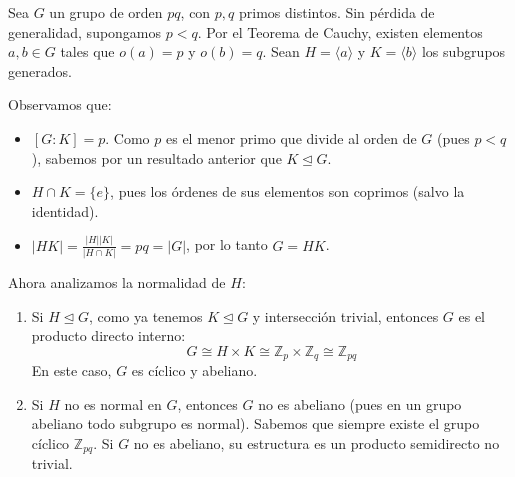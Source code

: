 \begin{eje}
    Sea $G$ un grupo de orden $pq$, con $p, q$ primos distintos. Sin pérdida de generalidad, supongamos $p < q$.
    Por el Teorema de Cauchy, existen elementos $a, b \in G$ tales que $o(a) = p$ y $o(b) = q$.
    Sean $H = \langle a \rangle$ y $K = \langle b \rangle$ los subgrupos generados.
    
    Observamos que:
    \begin{itemize}
        \item $[G : K] = p$. Como $p$ es el menor primo que divide al orden de $G$ (pues $p < q$), sabemos por un resultado anterior que $K \trianglelefteq G$.
        \item $H \cap K = \{e\}$, pues los órdenes de sus elementos son coprimos (salvo la identidad).
        \item $|HK| = \frac{|H||K|}{|H \cap K|} = pq = |G|$, por lo tanto $G = HK$.
    \end{itemize}

    Ahora analizamos la normalidad de $H$:
    \begin{enumerate}
        \item[i)] Si $H \trianglelefteq G$, como ya tenemos $K \trianglelefteq G$ y intersección trivial, entonces $G$ es el producto directo interno:
        \begin{equation*}
            G \cong H \times K \cong \mathbb{Z}_p \times \mathbb{Z}_q \cong \mathbb{Z}_{pq}
        \end{equation*}
        En este caso, $G$ es cíclico y abeliano.
        
        \item[ii)] Si $H$ no es normal en $G$, entonces $G$ no es abeliano (pues en un grupo abeliano todo subgrupo es normal).
        Sabemos que siempre existe el grupo cíclico $\mathbb{Z}_{pq}$.
        Si $G$ no es abeliano, su estructura es un producto semidirecto no trivial.
    \end{enumerate}
\end{eje}


